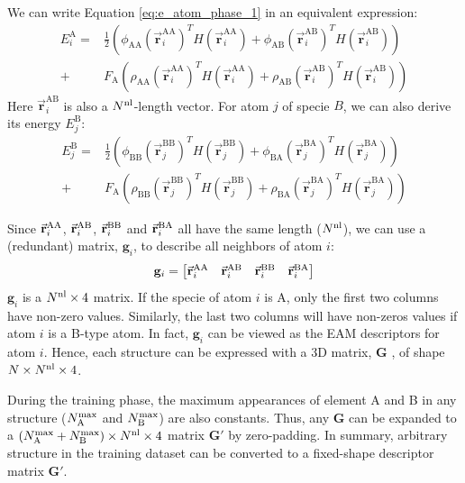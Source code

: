 \documentclass[prb,reprint]{revtex4-2}
\begin{document}
We can write Equation \ref{eq:e_atom_phase_1} in an equivalent expression:
\begin{align}
E_{i}^{\mathrm{A}} 
\label{eq:e_atom_A}
= &
\frac{1}{2}\left( 
    \phi_{\mathrm{AA}}(\vec{\mathbf{r}}_{i}^{\mathrm{AA}})^T
    H(\vec{\mathbf{r}}_{i}^{\mathrm{AA}}) +
    \phi_{\mathrm{AB}}(\vec{\mathbf{r}}_{i}^{\mathrm{AB}})^T
    H(\vec{\mathbf{r}}_{i}^{\mathrm{AB}})
\right) \nonumber \\
+ &
F_{\mathrm{A}}\left( 
    \rho_{\mathrm{AA}}(\vec{\mathbf{r}}_{i}^{\mathrm{AA}})^T
    H(\vec{\mathbf{r}}_{i}^{\mathrm{AA}}) +
    \rho_{\mathrm{AB}}(\vec{\mathbf{r}}_{i}^{\mathrm{AB}})^T
    H(\vec{\mathbf{r}}_{i}^{\mathrm{AB}})
\right)
\end{align}
Here $\vec{\mathbf{r}}_{i}^{\mathrm{AB}}$ is also a $N^{\mathrm{nl}}$-length vector. For 
atom $j$ of specie $B$, we can also derive its energy $E^{\mathrm{B}}_{j}$:
\begin{align}
E_{j}^{\mathrm{B}}
\label{eq:e_atom_B}
= &
\frac{1}{2}\left( 
    \phi_{\mathrm{BB}}(\vec{\mathbf{r}}_{j}^{\mathrm{BB}})^T
    H(\vec{\mathbf{r}}_{j}^{\mathrm{BB}}) +
    \phi_{\mathrm{BA}}(\vec{\mathbf{r}}_{j}^{\mathrm{BA}})^T
    H(\vec{\mathbf{r}}_{j}^{\mathrm{BA}})
\right) \nonumber \\
+ &
F_{\mathrm{A}}\left( 
    \rho_{\mathrm{BB}}(\vec{\mathbf{r}}_{j}^{\mathrm{BB}})^T
    H(\vec{\mathbf{r}}_{j}^{\mathrm{BB}}) +
    \rho_{\mathrm{BA}}(\vec{\mathbf{r}}_{j}^{\mathrm{BA}})^T
    H(\vec{\mathbf{r}}_{j}^{\mathrm{BA}})
\right)
\end{align}

Since $\vec{\mathbf{r}}_{i}^{\mathrm{AA}}$, $\vec{\mathbf{r}}_{i}^{\mathrm{AB}}$, $\vec{\mathbf{r}}_{i}^{\mathrm{BB}}$ and $\vec{\mathbf{r}}_{i}^{\mathrm{BA}}$ all have the same length ($N^{\mathrm{nl}}$), 
we can use a (redundant) matrix, $\mathbf{g}_{i}$, to describe all neighbors of 
atom $i$:
\begin{equation}
\mathbf{g}_i = \begin{bmatrix}
    \vec{\mathbf{r}}_{i}^{\mathrm{AA}} & \vec{\mathbf{r}}_{i}^{\mathrm{AB}} & \vec{\mathbf{r}}_{i}^{\mathrm{BB}} & \vec{\mathbf{r}}_{i}^{\mathrm{BA}} \\
\end{bmatrix}
\end{equation}
$\mathbf{g}_i$ is a $N^{\mathrm{nl}} \times 4$ matrix. If the specie of atom $i$ is A, only
the first two columns have non-zero values. Similarly, the last two columns will
have non-zeros values if atom $i$ is a B-type atom. In fact, $\mathbf{g}_i$ can
be viewed as the EAM descriptors for atom $i$. Hence, each structure can be 
expressed with a 3D matrix, $\mathbf{G}$ , of shape $N \times N^{\mathrm{nl}} \times 4$.

During the training phase, the maximum appearances of element A and B in any 
structure ($N_{\mathrm{A}}^{\mathrm{max}}$ and $N_{\mathrm{B}}^{\mathrm{max}}$) are also constants. Thus, any $\mathbf{G}$ can 
be expanded to a $(N_{\mathrm{A}}^{\mathrm{max}} + N_{\mathrm{B}}^{\mathrm{max}}) \times N^{\mathrm{nl}} \times 4$ matrix $\mathbf{G}'$ 
by zero-padding. In summary, arbitrary structure in the training dataset can be 
converted to a fixed-shape descriptor matrix $\mathbf{G}'$. 
\end{document}

